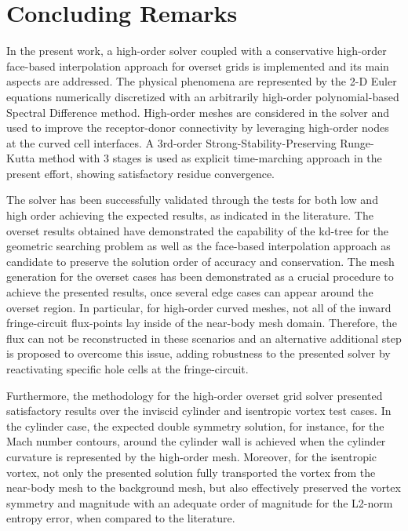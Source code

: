\section{Concluding Remarks}

In the present work, a high-order solver coupled with a conservative high-order face-based interpolation approach for overset grids is implemented and its main aspects are addressed. The physical phenomena are represented by the 2-D Euler equations numerically discretized with an arbitrarily high-order polynomial-based Spectral Difference method. High-order meshes are considered in the solver and used to improve the receptor-donor connectivity by leveraging high-order nodes at the curved cell interfaces. A 3rd-order Strong-Stability-Preserving Runge-Kutta method with 3 stages is used as explicit time-marching approach in the present effort, showing satisfactory residue convergence.

The solver has been successfully validated through the tests for both low and high order achieving the expected results, as indicated in the literature. The overset results obtained have demonstrated the capability of the kd-tree for the geometric searching problem as well as the face-based interpolation approach as candidate to preserve the solution order of accuracy and conservation. The mesh generation for the overset cases has been demonstrated as a crucial procedure to achieve the presented results, once several edge cases can appear around the overset region. In particular, for high-order curved meshes, not all of the inward fringe-circuit flux-points lay inside of the near-body mesh domain. Therefore, the flux can not be reconstructed in these scenarios and an alternative additional step is proposed to overcome this issue, adding robustness to the presented solver by reactivating specific hole cells at the fringe-circuit.

Furthermore, the methodology for the high-order overset grid solver presented satisfactory results over the inviscid cylinder and isentropic vortex test cases. In the cylinder case, the expected double symmetry solution, for instance, for the Mach number contours, around the cylinder wall is achieved when the cylinder curvature is represented by the high-order mesh. Moreover, for the isentropic vortex, not only the presented solution fully transported the vortex from the near-body mesh to the background mesh, but also effectively preserved the vortex symmetry and magnitude with an adequate order of magnitude for the L2-norm entropy error, when compared to the literature. 

